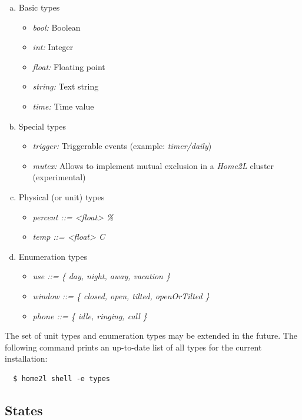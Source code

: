 \documentclass[12pt,english,parskip=half,headheight=19pt]{scrreprt}
\begin{document}
\begin{enumerate}[a)]

\item Basic types
  \begin{itemize}
    \item \textit{bool:} Boolean
    \item \textit{int:} Integer
    \item \textit{float:} Floating point
    \item \textit{string:} Text string
    \item \textit{time:} Time value
  \end{itemize}

\item Special types
  \begin{itemize}
    \item \textit{trigger:}  Triggerable events (example: \textit{timer/daily})
    \item \textit{mutex:} Allows to implement mutual exclusion in a \textit{Home2L} cluster (experimental)
  \end{itemize}

\item Physical (or unit) types
  \begin{itemize}
    \item \textit{percent ::= <float> \%}
    \item \textit{temp ::= <float> \textdegree C}
  \end{itemize}

\item Enumeration types
  \begin{itemize}
    \item \textit{use ::= \{ day, night, away, vacation \}}
    \item \textit{window ::= \{ closed, open, tilted, openOrTilted \}}
    \item \textit{phone ::= \{ idle, ringing, call \}}
  \end{itemize}

\end{enumerate}

The set of unit types and enumeration types may be extended in the future.
The following command prints an up-to-date list of all types for the current installation:
\begin{lstlisting}
  $ home2l shell -e types
\end{lstlisting}



\subsection{States}
\label{sec:resources-resources-states}
\end{document}
